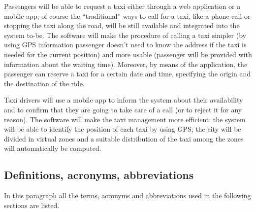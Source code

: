 Passengers will be able to request a taxi either through a web application
or a mobile app; of course the ``traditional'' ways to call for
a taxi, like a phone call or stopping the taxi along the road, will
be still available and integrated into the system to-be. The software
will make the procedure of calling a taxi simpler (by using GPS information
passenger doesn't need to know the address if the taxi is needed for
the current position) and more usable (passenger will be provided
with information about the waiting time). Moreover, by means of the
application, the passenger can reserve a taxi for a certain date and
time, specifying the origin and the destination of the ride.

Taxi drivers will use a mobile app to inform the system about their
availability and to confirm that they are going to take care of a
call (or to reject it for any reason). The software will make the
taxi management more efficient: the system will be able to identify
the position of each taxi by using GPS; the city will be divided in
virtual zones and a suitable distribution of the taxi among the zones
will automatically be computed.


\subsection{Definitions, acronyms, abbreviations }

In this paragraph all the terms, acronyms and abbreviations used in
the following sections are listed.


